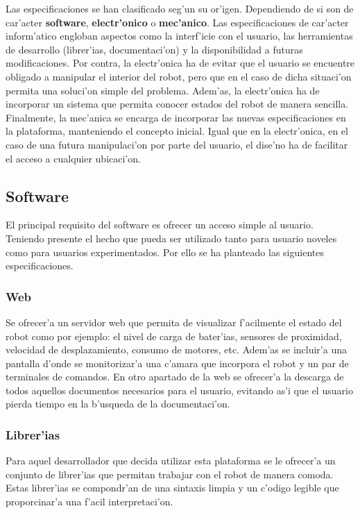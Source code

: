 \documentclass[twoside]{article}
\begin{document}
Las especificaciones se han clasificado seg'un su or'igen. Dependiendo de si son de car'acter \textbf{software}, \textbf{electr'onico} o \textbf{mec'anico}. Las especificaciones de car'acter inform'atico engloban aspectos como la interf'icie con el usuario, las herramientas de desarrollo (librer'ias, documentaci'on) y la disponibilidad a futuras modificaciones. Por contra, la electr'onica ha de evitar que el usuario se encuentre obligado a manipular el interior del robot, pero que en el caso de dicha situaci'on permita una soluci'on simple del problema. Adem'as, la electr'onica ha de incorporar un sistema que permita conocer estados del robot de manera sencilla. Finalmente, la mec'anica se encarga de incorporar las nuevas especificaciones en la plataforma, manteniendo el concepto inicial. Igual que en la electr'onica, en el caso de una futura manipulaci'on por parte del usuario, el dise'no ha de facilitar el acceso a cualquier ubicaci'on.

\subsection{Software}
El principal requisito del software es ofrecer un acceso simple al usuario. Teniendo presente el hecho que pueda ser utilizado tanto para usuario noveles como para usuarios experimentados. Por ello se ha planteado las siguientes especificaciones.

\subsubsection{Web}
Se ofrecer'a un servidor web que permita de visualizar f'acilmente el estado del robot como por ejemplo: el nivel de carga de bater'ias, sensores de proximidad, velocidad de desplazamiento, consumo de motores, etc. Adem'as se incluir'a una pantalla d'onde se monitorizar'a una c'amara que incorpora el robot y un par de terminales de comandos.
En otro apartado de la web se ofrecer'a la descarga de todos aquellos documentos necesarios para el usuario, evitando as'i que el usuario pierda tiempo en la b'usqueda de la documentaci'on.

\subsubsection{Librer'ias}
Para aquel desarrollador que decida utilizar esta plataforma se le ofrecer'a un conjunto de librer'ias que permitan trabajar con el robot de manera comoda. Estas librer'ias se compondr'an de una sintaxis limpia y un c'odigo legible que proporcinar'a una f'acil interpretaci'on.    
\end{document}
